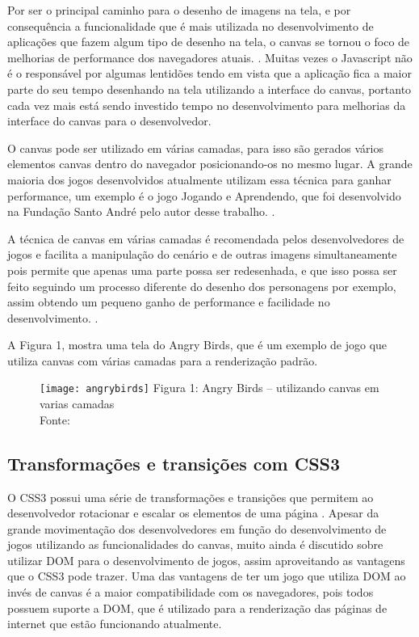 Por ser o principal caminho para o desenho de imagens na tela, e por
consequência a funcionalidade que é mais utilizada no desenvolvimento
de aplicações que fazem algum tipo de desenho na tela, o canvas se tornou o foco
de melhorias de performance dos navegadores atuais. \cite{website:w3ccanvas}. Muitas vezes
o Javascript não é o responsável por algumas lentidões
tendo em vista que a aplicação fica a maior parte do seu tempo
desenhando na tela utilizando a interface do canvas, portanto cada vez
mais está sendo investido tempo no desenvolvimento para melhorias da interface
do canvas para o desenvolvedor.

O canvas pode ser utilizado em várias camadas, para isso são gerados
vários elementos canvas dentro do navegador posicionando-os no mesmo
lugar. A grande maioria dos jogos desenvolvidos atualmente utilizam
essa técnica para ganhar performance, um exemplo é o jogo Jogando e
Aprendendo, que foi desenvolvido na Fundação Santo André pelo autor
desse trabalho. \cite{website:jogandoeaprendendo}.

A técnica de canvas em várias camadas é recomendada pelos desenvolvedores de jogos e
facilita a manipulação do cenário e de outras imagens simultaneamente pois permite que
apenas uma parte possa ser redesenhada, e que isso possa ser feito
seguindo um processo diferente do desenho dos personagens por exemplo,
assim obtendo um pequeno ganho de performance e facilidade no desenvolvimento. \cite{fulton2011html5}.

A Figura 1, mostra uma tela do Angry Birds, que é um exemplo de jogo
que utiliza canvas com várias camadas para a renderização padrão.

\newlength{\imgwidth}
\setlength{\imgwidth}{16.09cm}
\newlength{\imgheight}
\setlength{\imgheight}{10.59cm}

\begin{figure}[H]
  \centering
	\texttt{[image: angrybirds]}
	\footnotesize\hspace{8\baselineskip}
	Figura 1: Angry Birds {--} utilizando canvas em varias camadas \\
	Fonte: \cite{website:angrybirds}
  \label{img:angrybirds}
\end{figure}

\subsection{Transformações e transições com CSS3}

O CSS3 possui uma série de transformações e transições que permitem ao
desenvolvedor rotacionar e escalar os elementos de uma página
\cite{agi2011html5}. Apesar da grande movimentação dos desenvolvedores
em função do desenvolvimento de jogos utilizando as funcionalidades do
canvas, muito ainda é discutido sobre utilizar DOM para o
desenvolvimento de jogos, assim aproveitando as vantagens que o CSS3
pode trazer.
Uma das vantagens de ter um jogo que utiliza DOM ao invés de canvas é
a maior compatibilidade com os navegadores, pois todos possuem suporte
a DOM, que é utilizado para a renderização das páginas de internet que
estão funcionando atualmente.

